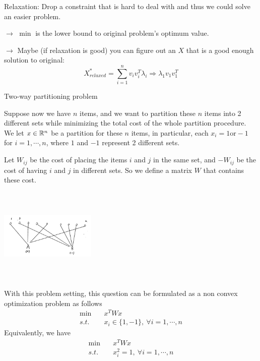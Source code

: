 Relaxation: Drop a constraint that is hard to deal with and thus we could solve an easier problem. 

$\rightarrow$ $\min$ is the lower bound to original problem's optimum value. 

$\rightarrow$ Maybe (if relaxation is good) you can figure out an $X$ that is a good enough solution to original:
\begin{equation*}
X^*_{relaxed} =\sum^n_{i=1}v_iv^T_i\lambda_i \Rightarrow \lambda_1v_1 v^T_1
\end{equation*}




\begin{example}{Two-way partitioning problem}
	
	Suppose now we have $n$ items, and we want to partition these $n$ items into 2 different sets while minimizing the total cost of the whole partition procedure. We let $x\in\mathbb{R}^n$ be a partition for these $n$ items, in particular, each $x_i=1 \text{or} -1$ for $i=1,\cdots, n$, where $1$ and $-1$ represent 2 different sets.
	
	Let $W_{ij}$ be the cost of placing the items $i$ and $j$ in the same set, and $-W_{ij}$ be the cost of having $i$ and $j$ in different sets. So we define a matrix $W$ that contains these cost.
	
	\begin{marginfigure}
	\centering
	\includegraphics[width=1.8in,height=1.8in]{figures/ch09/figure1120_1.png}
	\end{marginfigure}

With this problem setting, this question can be formulated as a non convex optimization problem as follows
\begin{align*}
\min \quad&x^TWx \\
s.t. \quad&x_i\in \{1,-1 \},\ \forall i=1,\cdots, n
\end{align*}
Equivalently, we have
\begin{align*}
\min \quad&x^TWx \\
s.t. \quad&x_i^2 = 1,\ \forall i = 1,\cdots,n
\end{align*}


\end{example}
